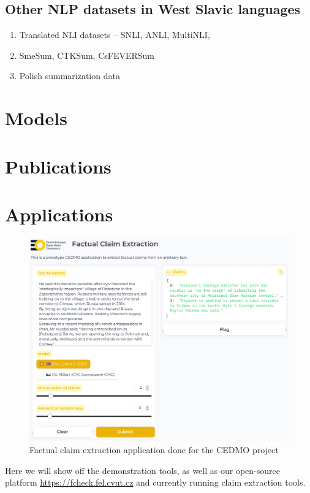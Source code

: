 \subsection{\FCZ}
\subsection{\CTK}
\subsection{Other NLP datasets in West Slavic languages}
\begin{enumerate}
    \item {\techbf Translated NLI datasets} -- SNLI, ANLI, MultiNLI, 
    \item SmeSum, CTKSum, CsFEVERSum
    \item Polish summarization data
\end{enumerate}
\section{Models}
\label{sec:models}
\section{Publications}
\label{sec:publications}
\section{Applications}
\label{sec:applications}

\begin{figure}
    \includegraphics[width=16cm]{fig/cedmo.pdf}
    \caption{Factual claim extraction application done for the CEDMO project}
    \label{fig:framework}
\end{figure}

Here we will show off the demonstration tools, as well as our open-source platform \url{https://fcheck.fel.cvut.cz} and currently running claim extraction tools. 